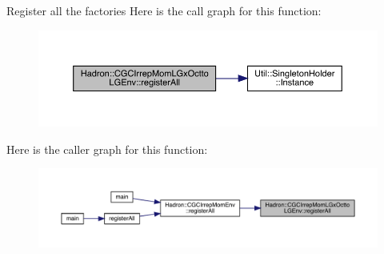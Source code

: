 Register all the factories Here is the call graph for this function\+:\nopagebreak
\begin{figure}[H]
\begin{center}
\leavevmode
\includegraphics[width=350pt]{d8/d3a/namespaceHadron_1_1CGCIrrepMomLGxOcttoLGEnv_a8e2a60d80852181dcdfbcef290164852_cgraph}
\end{center}
\end{figure}
Here is the caller graph for this function\+:\nopagebreak
\begin{figure}[H]
\begin{center}
\leavevmode
\includegraphics[width=350pt]{d8/d3a/namespaceHadron_1_1CGCIrrepMomLGxOcttoLGEnv_a8e2a60d80852181dcdfbcef290164852_icgraph}
\end{center}
\end{figure}
